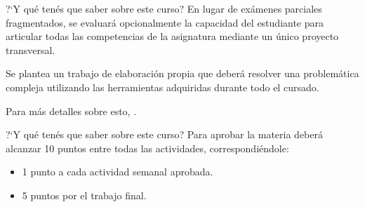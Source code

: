 \documentclass[8pt]{beamer}
\begin{document}
	
	
	
		\begin{frame}{?`Y qu\'e ten\'es que saber sobre este curso?}
		En lugar de exámenes parciales fragmentados, se evaluará opcionalmente la capacidad del estudiante para articular todas las competencias de la asignatura mediante un único proyecto transversal.
		
		Se plantea un trabajo de elaboración propia que deberá resolver una problemática com­pleja utilizando las herramientas adquiridas durante todo el cursado.
		
		Para m\'as detalles sobre esto, .
	\end{frame}
	
	
	
	\begin{frame}{?`Y qu\'e ten\'es que saber sobre este curso?}
		Para aprobar la materia deberá alcanzar 10 puntos entre todas las actividades, correspondiéndole:
		\begin{itemize}
			\item 1 punto a cada actividad semanal aprobada.
			\item 5 puntos por el trabajo final.
		\end{itemize}
		
	\end{frame}
\end{document}
